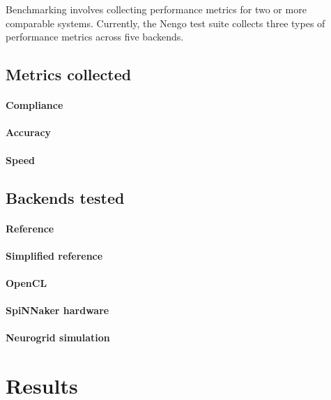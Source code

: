 \documentclass{frontiersSCNS}
\begin{document}
Benchmarking involves collecting performance metrics
for two or more comparable systems.
Currently, the Nengo test suite collects
three types of performance metrics
across five backends.

\subsection{Metrics collected}

\paragraph{Compliance\textcolon}

\paragraph{Accuracy\textcolon}

\paragraph{Speed\textcolon}

\subsection{Backends tested}

\paragraph{Reference\textcolon}

\paragraph{Simplified reference\textcolon}

\paragraph{OpenCL\textcolon}

\paragraph{SpiNNaker hardware\textcolon}

\paragraph{Neurogrid simulation\textcolon}

\section{Results}
\end{document}
